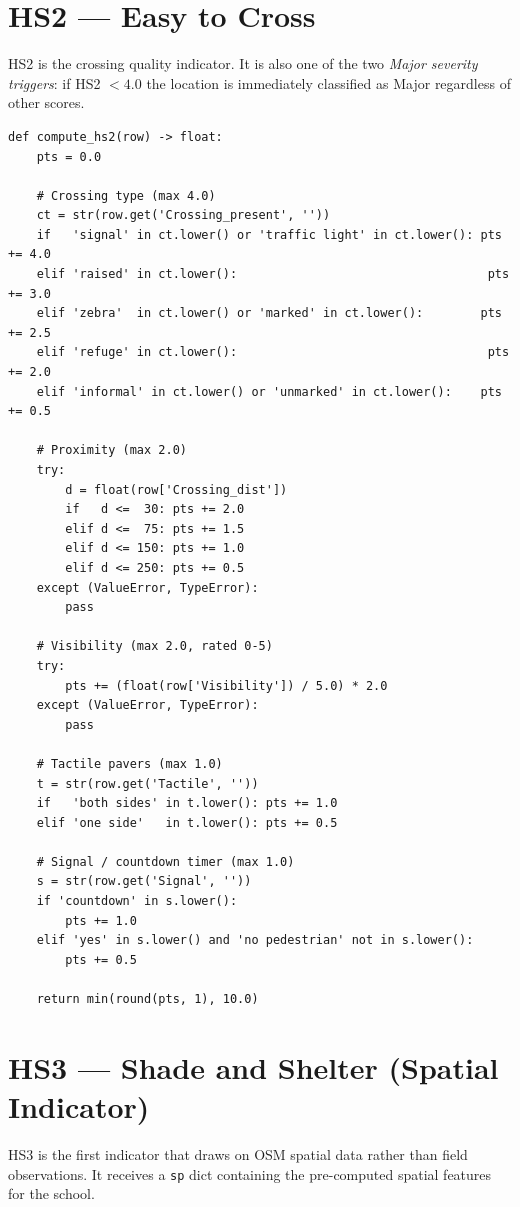 \documentclass[11pt,a4paper,openany]{book}
\begin{document}
\section{HS2 --- Easy to Cross}

HS2 is the crossing quality indicator. It is also one of the two \emph{Major severity triggers}: if HS2 $< 4.0$ the location is immediately classified as Major regardless of other scores.

\begin{lstlisting}[style=python, caption={Full source: src/scoring/hs2.py.}]
def compute_hs2(row) -> float:
    pts = 0.0

    # Crossing type (max 4.0)
    ct = str(row.get('Crossing_present', ''))
    if   'signal' in ct.lower() or 'traffic light' in ct.lower(): pts += 4.0
    elif 'raised' in ct.lower():                                   pts += 3.0
    elif 'zebra'  in ct.lower() or 'marked' in ct.lower():        pts += 2.5
    elif 'refuge' in ct.lower():                                   pts += 2.0
    elif 'informal' in ct.lower() or 'unmarked' in ct.lower():    pts += 0.5

    # Proximity (max 2.0)
    try:
        d = float(row['Crossing_dist'])
        if   d <=  30: pts += 2.0
        elif d <=  75: pts += 1.5
        elif d <= 150: pts += 1.0
        elif d <= 250: pts += 0.5
    except (ValueError, TypeError):
        pass

    # Visibility (max 2.0, rated 0-5)
    try:
        pts += (float(row['Visibility']) / 5.0) * 2.0
    except (ValueError, TypeError):
        pass

    # Tactile pavers (max 1.0)
    t = str(row.get('Tactile', ''))
    if   'both sides' in t.lower(): pts += 1.0
    elif 'one side'   in t.lower(): pts += 0.5

    # Signal / countdown timer (max 1.0)
    s = str(row.get('Signal', ''))
    if 'countdown' in s.lower():
        pts += 1.0
    elif 'yes' in s.lower() and 'no pedestrian' not in s.lower():
        pts += 0.5

    return min(round(pts, 1), 10.0)
\end{lstlisting}

\section{HS3 --- Shade and Shelter (Spatial Indicator)}

HS3 is the first indicator that draws on OSM spatial data rather than field observations. It receives a \texttt{sp} dict containing the pre-computed spatial features for the school.
\end{document}

